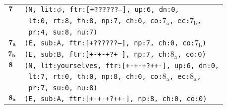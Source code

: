 \documentclass{article}
\begin{document}
\begin{minipage}{\textwidth}
{\begin{tabular}{|r|l|}
    ${\textbf{\textrm{7}}_{\phantom{z}}}$ & \texttt{\texttt{(N,~lit:$\phi$,~ftr:[+??????--],~up:6,~dn:0,}} \\
    & \texttt{\texttt{~lt:0,~rt:8,~th:8,~np:7,~ch:0,~co:${\textrm{7}_{\textrm{a}}}$,~ec:${\textrm{7}_{\textrm{b}}}$,}} \\
    & \texttt{\texttt{~pr:4,~su:8,~nu:7)}} \\
    ${\textbf{\textrm{7}}_{\textbf{\textrm{a}}}}$ & \texttt{\texttt{(E,~sub:A,~ftr:[+??????--],~np:7,~ch:0,~co:${\textrm{7}_{\textrm{b}}}$)}} \\
    ${\textbf{\textrm{7}}_{\textbf{\textrm{b}}}}$ & \texttt{\texttt{(E,~sub:B,~ftr:[+-+-+?+--],~np:7,~ch:${\textrm{8}_{\textrm{a}}}$,~co:0)}} \\
    ${\textbf{\textrm{8}}_{\phantom{z}}}$ & \texttt{\texttt{(N,~lit:yourselves,~ftr:[+-+-+?++-],~up:6,~dn:0,}} \\
    & \texttt{\texttt{~lt:7,~rt:0,~th:0,~np:8,~ch:0,~co:${\textrm{8}_{\textrm{a}}}$,~ec:${\textrm{8}_{\textrm{a}}}$,}} \\
    & \texttt{\texttt{~pr:7,~su:0,~nu:8)}} \\
    ${\textbf{\textrm{8}}_{\textbf{\textrm{a}}}}$ & \texttt{\texttt{(E,~sub:A,~ftr:[+-+-+?++-],~np:8,~ch:0,~co:0)}} \\
    \hline
  \end{tabular}
  }
\end{minipage}
\bigbreak
\end{document}
